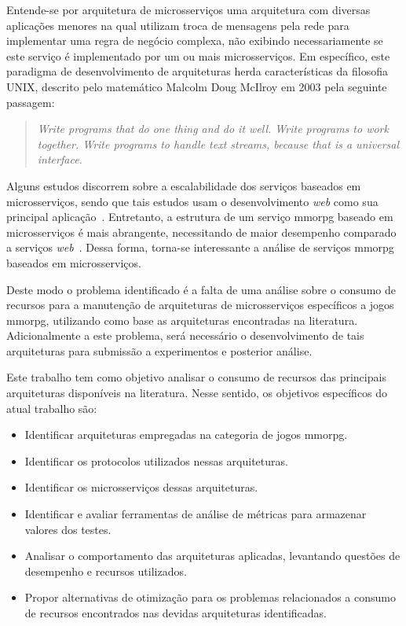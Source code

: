 Entende-se por arquitetura de microsserviços uma arquitetura com diversas aplicações menores na qual utilizam troca de mensagens pela rede  para implementar uma regra de negócio complexa, não exibindo necessariamente se este serviço é implementado por um ou mais microsserviços.
%
Em específico, este paradigma de desenvolvimento de arquiteturas herda características da filosofia UNIX, descrito pelo matemático Malcolm Doug McIlroy em 2003 pela seguinte passagem:

\begin{quotation}
    \textit{Write programs that do one thing and do it well. Write programs to work together. Write programs to handle text streams, because that is a universal interface.}\\
    \cite{Raymond2003Oct}
\end{quotation}

Alguns estudos discorrem sobre a escalabilidade dos serviços baseados em microsserviços, sendo que tais estudos usam o desenvolvimento \textit{web} como sua principal aplicação~\cite{photon_engine, mmorpg_culture, DiFrancesco2017Apr}.
%
Entretanto, a estrutura de um serviço \ac{mmorpg} baseado em microsserviços é mais abrangente, necessitando de maior desempenho comparado a serviços \textit{web}~\cite{photon_engine, mmorpg_culture}.
%
Dessa forma, torna-se interessante a análise de serviços \ac{mmorpg} baseados em microsserviços.


Deste modo o problema identificado é a falta de uma análise sobre o consumo de recursos para a manutenção de arquiteturas de microsserviços específicos a jogos \ac{mmorpg}, utilizando como base as arquiteturas encontradas na literatura.
%
Adicionalmente a este problema, será necessário o desenvolvimento de tais arquiteturas para submissão a experimentos e posterior análise.

Este trabalho tem como objetivo analisar o consumo de recursos das principais arquiteturas disponíveis na literatura.
%
Nesse sentido, os objetivos específicos do atual trabalho são:

\begin{itemize}
    \item Identificar arquiteturas empregadas na categoria de jogos \ac{mmorpg}.
    \item Identificar os protocolos utilizados nessas arquiteturas.
    \item Identificar os microsserviços dessas arquiteturas.
    \item Identificar e avaliar ferramentas de análise de métricas para armazenar valores dos testes.
    \item Analisar o comportamento das arquiteturas aplicadas, levantando questões de desempenho e recursos utilizados.
    \item Propor alternativas de otimização para os problemas relacionados a consumo de recursos encontrados nas devidas arquiteturas identificadas.
\end{itemize}


